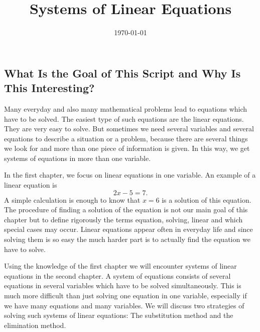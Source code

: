 \documentclass[twoside,11pt,a4paper]{article}
\begin{document}
\pagestyle{empty}

  \title{\Huge Systems of Linear Equations}
  \author{ }
	
  \date{\large \today}
  \maketitle
\thispagestyle{empty}

\pagestyle{empty}




\newpage
\pagestyle{empty}

\tableofcontents
\vfill

\subsection*{What Is the Goal of This Script and Why Is This Interesting?}

Many everyday and also many mathematical problems lead to equations which have to be solved. The easiest type of such equations are the linear equations. They are very easy to solve. But sometimes we need several variables and several equations to describe a situation or a problem, because there are several things we look for and more than one piece of information is given. In this way, we get systems of equations in more than one variable. 
\vsp

In the first chapter, we focus on linear equations in one variable. An example of a linear equation is
\[
2x-5=7.
\] 
A simple calculation is enough to know that $x=6$ is a solution of this equation. The procedure of finding a solution of the equation is not our main goal of this chapter but to define rigorously the terms equation, solving, linear and which special cases may occur. Linear equations appear often in everyday life and since solving them is so easy the much harder part is to actually find the equation we have to solve. 
\vsp

Using the knowledge of the first chapter we will encounter systems of linear equations in the second chapter. A system of equations consists of several equations in several variables which have to be solved simultaneously. This is much more difficult than just solving one equation in one variable, especially if we have many equations and many variables. We will discuss two strategies of solving such systems of linear equations: The substitution method and the elimination method. 
\end{document}
